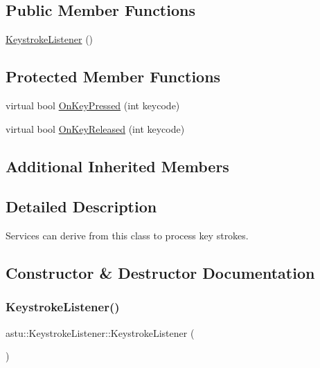 \subsection*{Public Member Functions}
\begin{DoxyCompactItemize}
\item 
\hyperlink{classastu_1_1KeystrokeListener_a340f231e4a21ef439760d90ead292553}{Keystroke\+Listener} ()
\end{DoxyCompactItemize}
\subsection*{Protected Member Functions}
\begin{DoxyCompactItemize}
\item 
virtual bool \hyperlink{classastu_1_1KeystrokeListener_ad4bb14ad1fd43fd200411353eeb99b5a}{On\+Key\+Pressed} (int keycode)
\item 
virtual bool \hyperlink{classastu_1_1KeystrokeListener_ae9c5d19ae49d2e340ed7f832e1efab03}{On\+Key\+Released} (int keycode)
\end{DoxyCompactItemize}
\subsection*{Additional Inherited Members}


\subsection{Detailed Description}
Services can derive from this class to process key strokes. 

\subsection{Constructor \& Destructor Documentation}
\mbox{\label{classastu_1_1KeystrokeListener_a340f231e4a21ef439760d90ead292553}} 
\subsubsection{\texorpdfstring{Keystroke\+Listener()}{KeystrokeListener()}}
{\footnotesize\ttfamily astu\+::\+Keystroke\+Listener\+::\+Keystroke\+Listener (\begin{DoxyParamCaption}{ }\end{DoxyParamCaption})\hspace{0.3cm}{\ttfamily [inline]}}

